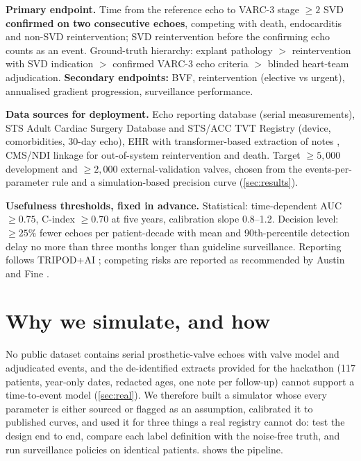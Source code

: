 \documentclass[11pt,a4paper]{article}
\begin{document}
\textbf{Primary endpoint.} Time from the reference echo to VARC-3 stage $\geq 2$ SVD \textbf{confirmed on two consecutive echoes}, competing with death, endocarditis and non-SVD reintervention; SVD reintervention before the confirming echo counts as an event. Ground-truth hierarchy: explant pathology $>$ reintervention with SVD indication $>$ confirmed VARC-3 echo criteria $>$ blinded heart-team adjudication. \textbf{Secondary endpoints:} BVF, reintervention (elective vs urgent), annualised gradient progression, surveillance performance.

\textbf{Data sources for deployment.} Echo reporting database (serial measurements), STS Adult Cardiac Surgery Database and STS/ACC TVT Registry (device, comorbidities, 30-day echo), EHR with transformer-based extraction of notes \cite{xie2026}, CMS/NDI linkage for out-of-system reintervention and death. Target $\geq 5{,}000$ development and $\geq 2{,}000$ external-validation valves, chosen from the events-per-parameter rule \cite{riley2020} and a simulation-based precision curve (\cref{sec:results}).

\textbf{Usefulness thresholds, fixed in advance.} Statistical: time-dependent AUC $\geq 0.75$, C-index $\geq 0.70$ at five years, calibration slope 0.8--1.2. Decision level: $\geq 25\%$ fewer echoes per patient-decade with mean and 90th-percentile detection delay no more than three months longer than guideline surveillance. Reporting follows TRIPOD+AI \cite{collins2024}; competing risks are reported as recommended by Austin and Fine \cite{austin2017}.

\section{Why we simulate, and how}\label{sec:sim}

No public dataset contains serial prosthetic-valve echoes with valve model and adjudicated events, and the de-identified extracts provided for the hackathon (117 patients, year-only dates, redacted ages, one note per follow-up) cannot support a time-to-event model (\cref{sec:real}). We therefore built a simulator whose every parameter is either sourced or flagged as an assumption, calibrated it to published curves, and used it for three things a real registry cannot do: test the design end to end, compare each label definition with the noise-free truth, and run surveillance policies on identical patients.  shows the pipeline.
\end{document}
